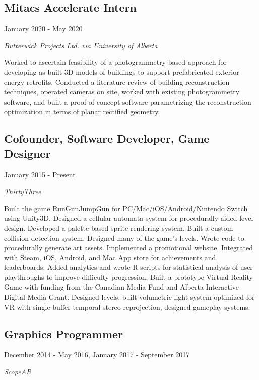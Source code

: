 \documentclass[10pt]{article}
\begin{document}
\subsection*{Mitacs Accelerate Intern}
January 2020 - May 2020

\emph{Butterwick Projects Ltd. via University of Alberta}
\vspace{\baselineskip}

Worked to ascertain feasibility of a photogrammetry-based approach for developing as-built 3D models of buildings to support prefabricated exterior energy retrofits. Conducted a literature review of building reconstruction techniques, operated cameras on site, worked with existing photogrammetry software, and built a proof-of-concept software parametrizing the reconstruction optimization in terms of planar rectified geometry.

\subsection*{Cofounder, Software Developer, Game Designer}
January 2015 - Present

\emph{ThirtyThree}
\vspace{\baselineskip}

Built the game RunGunJumpGun for PC/Mac/iOS/Android/Nintendo Switch using Unity3D. Designed a cellular automata system for procedurally aided level design. Developed a palette-based sprite rendering system. Built a custom collision detection system. Designed many of the game's levels. Wrote code to procedurally generate art assets. Implemented a promotional website. Integrated with Steam, iOS, Android, and Mac App store for achievements and leaderboards. Added analytics and wrote R scripts for statistical analysis of user playthroughs to improve difficulty progression. Built a prototype Virtual Reality Game with funding from the Canadian Media Fund and Alberta Interactive Digital Media Grant. Designed levels, built volumetric light system optimized for VR with single-buffer temporal stereo reprojection, designed gameplay systems.


\subsection*{Graphics Programmer}
December 2014 - May 2016, January 2017 - September 2017

\emph{ScopeAR}
\vspace{\baselineskip}
\end{document}

